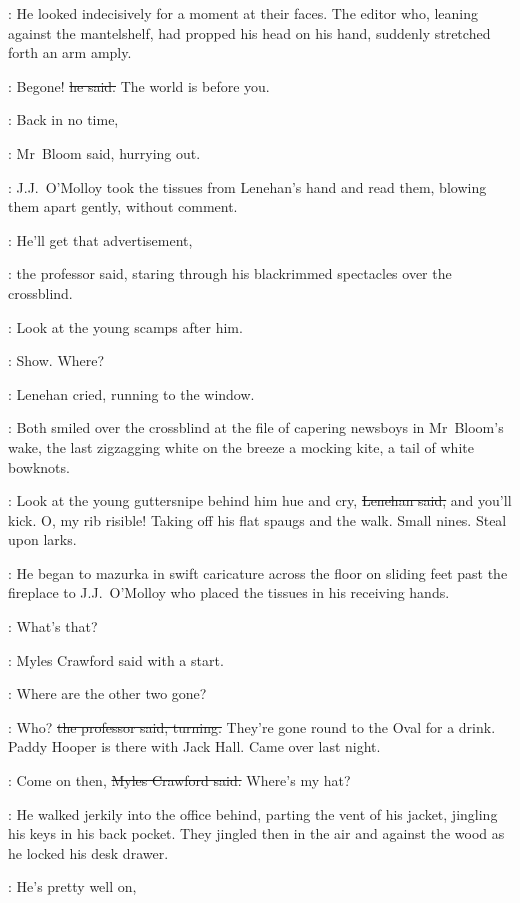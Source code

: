 :
He looked indecisively for a moment at their faces.
The editor
who, leaning against the mantelshelf,
had propped his head on his hand,
suddenly stretched forth an arm amply.

\crawford:
Begone!
\sout{he said.}
The world is before you.

\Bloom:
Back in no time,

:
Mr~Bloom said,
hurrying out.

:
J.J.~O'Molloy took the tissues from Lenehan's hand
and read them,
blowing them apart gently,
without comment.

\machugh:
He'll get that advertisement,

:
the professor said,
staring through his
blackrimmed spectacles over the crossblind.%

\machugh:
Look at the young scamps after him.

\Bloom:
Show.
Where?

:
Lenehan cried,
running to the window.



:
Both smiled over the crossblind
at the file of capering newsboys in Mr~Bloom's wake,
the last zigzagging white on the breeze a mocking kite,
a tail of white bowknots.

\lenehan:
Look at the young guttersnipe behind him
hue and cry,
\sout{Lenehan said,}
and you'll kick.
O, my rib risible!
Taking off his flat spaugs and the walk.
Small nines.
Steal upon larks.

:
He began to mazurka in swift caricature across the floor
on sliding feet past the fireplace to J.J.~O'Molloy
who placed the tissues in his receiving hands.

\crawford:
What's that?

:
Myles Crawford said
with a start.

\crawford:
Where are the other two gone?

\machugh:
Who?
\sout{the professor said, turning.}
They're gone round to the Oval for a drink.
Paddy Hooper is there with Jack Hall.
Came over last night.

\crawford:
Come on then,
\sout{Myles Crawford said.}
Where's my hat?

:
He walked jerkily into the office behind,
parting the vent of his jacket,
jingling his keys in his back pocket.
They jingled then in the air and against the wood
as he locked his desk drawer.

\machugh:
He's pretty well on,

